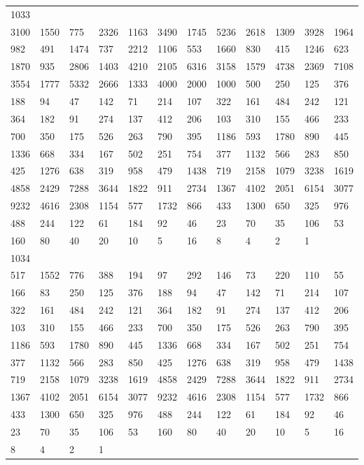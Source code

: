\begin{longtable}{llllllllllll}
1033&&&&&&&&&&&\\
3100& 1550& 775& 2326& 1163& 3490& 1745& 5236& 2618& 1309& 3928& 1964\\
982& 491& 1474& 737& 2212& 1106& 553& 1660& 830& 415& 1246& 623\\
1870& 935& 2806& 1403& 4210& 2105& 6316& 3158& 1579& 4738& 2369& 7108\\
3554& 1777& 5332& 2666& 1333& 4000& 2000& 1000& 500& 250& 125& 376\\
188& 94& 47& 142& 71& 214& 107& 322& 161& 484& 242& 121\\
364& 182& 91& 274& 137& 412& 206& 103& 310& 155& 466& 233\\
700& 350& 175& 526& 263& 790& 395& 1186& 593& 1780& 890& 445\\
1336& 668& 334& 167& 502& 251& 754& 377& 1132& 566& 283& 850\\
425& 1276& 638& 319& 958& 479& 1438& 719& 2158& 1079& 3238& 1619\\
4858& 2429& 7288& 3644& 1822& 911& 2734& 1367& 4102& 2051& 6154& 3077\\
9232& 4616& 2308& 1154& 577& 1732& 866& 433& 1300& 650& 325& 976\\
488& 244& 122& 61& 184& 92& 46& 23& 70& 35& 106& 53\\
160& 80& 40& 20& 10& 5& 16& 8& 4& 2& 1& \\

1034&&&&&&&&&&&\\
517& 1552& 776& 388& 194& 97& 292& 146& 73& 220& 110& 55\\
166& 83& 250& 125& 376& 188& 94& 47& 142& 71& 214& 107\\
322& 161& 484& 242& 121& 364& 182& 91& 274& 137& 412& 206\\
103& 310& 155& 466& 233& 700& 350& 175& 526& 263& 790& 395\\
1186& 593& 1780& 890& 445& 1336& 668& 334& 167& 502& 251& 754\\
377& 1132& 566& 283& 850& 425& 1276& 638& 319& 958& 479& 1438\\
719& 2158& 1079& 3238& 1619& 4858& 2429& 7288& 3644& 1822& 911& 2734\\
1367& 4102& 2051& 6154& 3077& 9232& 4616& 2308& 1154& 577& 1732& 866\\
433& 1300& 650& 325& 976& 488& 244& 122& 61& 184& 92& 46\\
23& 70& 35& 106& 53& 160& 80& 40& 20& 10& 5& 16\\
8& 4& 2& 1& \\


\end{longtable}
